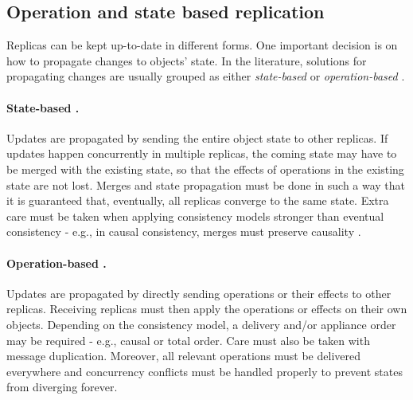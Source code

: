 \subsection{Operation and state based replication}
\label{subsec:operationStateReplication}

Replicas can be kept up-to-date in different forms.
One important decision is on how to propagate changes to objects' state.
In the literature, solutions for propagating changes are usually grouped as either \emph{state-based} or \emph{operation-based} \cite{crdt}.


\paragraph{State-based \cite{crdt}.} Updates are propagated by sending the entire object state to other replicas.
If updates happen concurrently in multiple replicas, the coming state may have to be merged with the existing state, so that the effects of operations in the existing state are not lost.
Merges and state propagation must be done in such a way that it is guaranteed that, eventually, all replicas converge to the same state.
Extra care must be taken when applying consistency models stronger than eventual consistency - e.g., in causal consistency, merges must preserve causality \cite{understandingEC}.

\paragraph{Operation-based \cite{crdt}.}
Updates are propagated by directly sending operations or their effects to other replicas.
Receiving replicas must then apply the operations or effects on their own objects.
Depending on the consistency model, a delivery and/or appliance order may be required - e.g., causal or total order.
Care must also be taken with message duplication.
Moreover, all relevant operations must be delivered everywhere and concurrency conflicts must be handled properly to prevent states from diverging forever.

